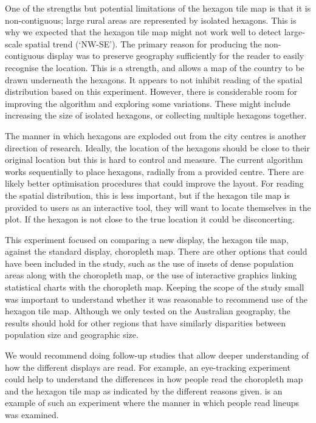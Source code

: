 \documentclass[
doublespace,
  times]{anzsauth}
\begin{document}
One of the strengths but potential limitations of the hexagon tile map
is that it is non-contiguous; large rural areas are represented by
isolated hexagons. This is why we expected that the hexagon tile map
might not work well to detect large-scale spatial trend (`NW-SE'). The
primary reason for producing the non-contiguous display was to preserve
geography sufficiently for the reader to easily recognise the location.
This is a strength, and allows a map of the country to be drawn
underneath the hexagons. It appears to not inhibit reading of the
spatial distribution based on this experiment. However, there is
considerable room for improving the algorithm and exploring some
variations. These might include increasing the size of isolated
hexagons, or collecting multiple hexagons together.

The manner in which hexagons are exploded out from the city centres is
another direction of research. Ideally, the location of the hexagons
should be close to their original location but this is hard to control
and measure. The current algorithm works sequentially to place hexagons,
radially from a provided centre. There are likely better optimisation
procedures that could improve the layout. For reading the spatial
distribution, this is less important, but if the hexagon tile map is
provided to users as an interactive tool, they will want to locate
themselves in the plot. If the hexagon is not close to the true location
it could be disconcerting.

This experiment focused on comparing a new display, the hexagon tile
map, against the standard display, choropleth map. There are other
options that could have been included in the study, such as the use of
insets of dense population areas along with the choropleth map, or the
use of interactive graphics linking statistical charts with the
choropleth map. Keeping the scope of the study small was important to
understand whether it was reasonable to recommend use of the hexagon
tile map. Although we only tested on the Australian geography, the
results should hold for other regions that have similarly disparities
between population size and geographic size.

We would recommend doing follow-up studies that allow deeper
understanding of how the different displays are read. For example, an
eye-tracking experiment could help to understand the differences in how
people read the choropleth map and the hexagon tile map as indicated by
the different reasons given. \citet{ZCHMR} is an example of such an
experiment where the manner in which people read lineups was examined.
\end{document}
